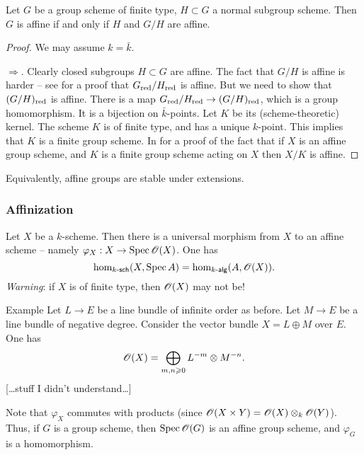 \begin{prop}
Let $G$ be a group scheme of finite type, $H\subset G$ a normal subgroup 
scheme. Then $G$ is affine if and only if $H$ and $G/H$ are affine. 
\end{prop}
\begin{proof}
We may assume $k=\bar k$. 

$\Rightarrow$. Clearly closed subgroups $H\subset G$ are affine. The fact that 
$G/H$ is affine is harder -- see \cite{b91} for a proof that 
$G_{\mathrm{red}}/H_{\mathrm{red}}$ is affine. But we need to show that 
$(G/H)_{\mathrm{red}}$ is affine. There is a map 
$G_{\mathrm{red}}/H_{\mathrm{red}} \to (G/H)_{\mathrm{red}}$, which is a group homomorphism. 
It is a bijection on $\bar k$-points. Let $K$ be its (scheme-theoretic) 
kernel. The scheme $K$ is of finite type, and has a unique $k$-point. This 
implies that $K$ is a finite group scheme. In \cite{m08} for a proof of the 
fact that if $X$ is an affine group scheme, and $K$ is a finite group scheme acting 
on $X$ then $X/K$ is affine. 
\end{proof}

Equivalently, affine groups are stable under extensions. 


\subsubsection{Affinization}

Let $X$ be a $k$-scheme. Then there is a universal morphism from $X$ to an affine 
scheme -- namely $\varphi_X:X \to \operatorname{Spec} \mathscr{O}(X)$. One has 
\[
  \hom_{k\textnormal{-}\mathsf{sch}}(X,\operatorname{Spec} A) = \hom_{k\textnormal{-}\mathsf{alg}}(A,\mathscr{O}(X)) .
\]
\emph{Warning}: if $X$ is of finite type, then $\mathscr{O}(X)$ may not be!

\begin{enonce}{Example}
Let $L\to E$ be a line bundle of infinite order as before. Let $M \to E$ be a 
line bundle of negative degree. Consider the vector bundle 
$X=L\oplus M$ over $E$. One has 
\[
  \mathscr{O}(X) = \bigoplus_{m,n\geqslant 0} L^{-m} \otimes M^{-n} .
\]
[\ldots stuff I didn't understand\ldots]
\end{enonce}

Note that $\varphi_X$ commutes with products (since 
$\mathscr{O}(X\times Y) = \mathscr{O}(X)\otimes_k \mathscr{O}(Y)$). Thus, if $G$ is a group scheme, then 
$\operatorname{Spec} \mathscr{O}(G)$ is an affine group scheme, and $\varphi_G$ is a homomorphism. 

